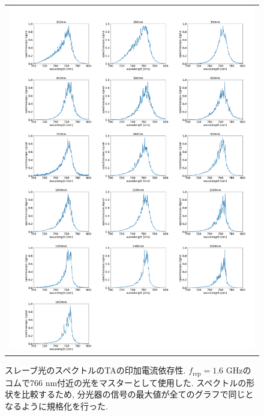 \documentclass[uplatex, dvipdfmx, a4paper, report, papersize, 11pt]{jsbook}
\begin{document}
\newpage
\begin{figure}[H]
  \centering
    \begin{tabular}{c}
      \begin{minipage}{1\hsize}
        \centering
          \includegraphics[keepaspectratio,  scale=0.20,  angle=0]
                          {figures/chapter4/760_slave-current_spectrum_astro.png}
                          \caption{スレーブ光のスペクトルのTAの印加電流依存性. $f_\mathrm{rep} = 1.6$ GHzのコムで$766$ nm付近の光をマスターとして使用した. スペクトルの形状を比較するため, 分光器の信号の最大値が全てのグラフで同じとなるように規格化を行った. }
                          \label{760_slave-current_spectrum_astro}
      \end{minipage}
  \end{tabular}
\end{figure}
\end{document}
